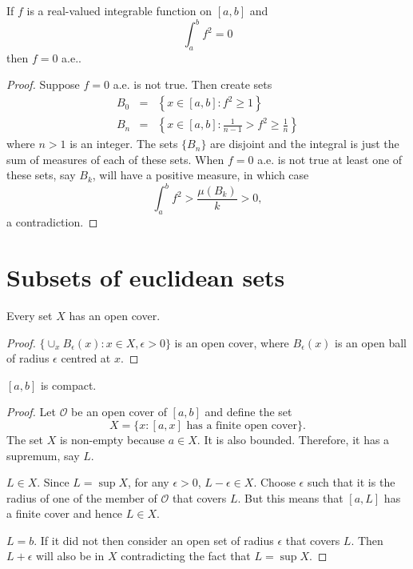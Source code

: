 \begin{thm}\label{c1s1t3}
If $f$ is a real-valued integrable function on $[a, b]$ and 
\[
\int_a^b f^2 = 0
\]
then $f = 0$ a.e..
\end{thm}
\begin{proof}
Suppose $f = 0$ a.e. is not true. Then create sets 
\begin{eqnarray*}
B_0 &=& \left\{x \in [a, b]: f^2 \ge 1\right\} \\
B_n &=& \left\{x \in [a, b] : \frac{1}{n-1} > f^2 \ge \frac{1}{n}\right\}
\end{eqnarray*}
where $n > 1$ is an integer. The sets $\{B_n\}$ are disjoint and the integral is
just the sum of measures of each of these sets. When $f = 0$ a.e. is not true
at least one of these sets, say $B_k$, will have a positive measure, in which
case
\[
\int_a^b f^2 > \frac{\mu(B_k)}{k} > 0,
\]
a contradiction.

\end{proof}

\section{Subsets of euclidean sets}\label{c1s2}
\begin{lem}\label{c1s2l1}
Every set $X$ has an open cover.
\end{lem}
\begin{proof}
$\{\cup_x B_\epsilon(x) : x \in X, \epsilon > 0\}$ is an open cover, where 
$B_\epsilon(x)$ is an open ball of radius $\epsilon$ centred at $x$.
\end{proof}

\begin{thm}\label{c1s2t1}
$[a, b]$ is compact.
\end{thm}
\begin{proof}
Let $\mathcal{O}$ be an open cover of $[a, b]$ and define the set
\[
X = \{x : [a, x] \text{ has a finite open cover}\}.
\]
The set $X$ is non-empty because $a \in X$. It is also bounded. Therefore, it
has a supremum, say $L$. 

$L \in X$. Since $L = \sup X$, for any $\epsilon > 0$, $L - \epsilon \in X$.
Choose $\epsilon$ such that it is the radius of one of the member of 
$\mathcal{O}$ that covers $L$. But this means that $[a, L]$ has a finite cover
and hence $L \in X$.

$L = b$. If it did not then consider an open set of radius $\epsilon$ that
covers $L$. Then $L + \epsilon$ will also be in $X$ contradicting the fact
that $L = \sup X$.
\end{proof}

